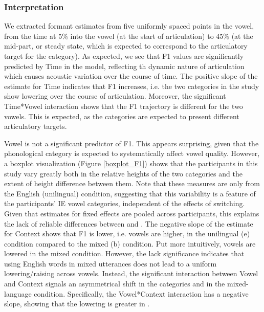 \documentclass[12 pt]{article}
\newcommand{\nt}[1]{\textipa{[#1]}} %
\begin{document}
\subsubsection*{Interpretation}
We extracted formant estimates from five uniformly spaced points in the vowel, from the time at 5\% into the vowel (at the start of articulation) to 45\% (at the mid-part, or steady state, which is expected to correspond to the articulatory target for the category). As expected, we see that F1 values are significantly predicted by Time in the model, reflecting th dynamic nature of articulation which causes acoustic variation over the course of time. The positive slope of the estimate for Time indicates that F1 increases, i.e. the two categories in the study show lowering over the course of articulation. Moreover, the significant Time*Vowel interaction shows that the F1 trajectory is different for the two vowels. This is expected, as the categories are expected to present different articulatory targets.  

 Vowel is not a significant predictor of F1. This appears surprising, given that the phonological category is expected to systematically affect vowel quality. However, a boxplot visualization (Figure \ref{boxplot_F1}) shows that the participants in this study vary greatly both in the relative heights of the two categories \nt{2, \ae} and the extent of height difference between them. Note that these measures are only from the English (unilingual) condition, suggesting that this variability is a feature of the participants' IE vowel categories, independent of the effects of switching. Given that estimates for fixed effects are pooled across participants, this explains the lack of reliable differences between \nt{2} and \nt{\ae}. The negative slope of the estimate for Context shows that F1 is lower, i.e. vowels are higher, in the unilingual (e) condition compared to the mixed (b) condition. Put more intuitively, vowels are lowered in the mixed condition. However, the lack significance indicates that using English words in mixed utterances does not lead to a uniform lowering/raising across vowels. Instead, the significant interaction between Vowel and Context signals an asymmetrical shift in the categories \nt{2} and \nt{\ae} in the mixed-language condition. Specifically, the Vowel*Context interaction has a negative slope, showing that the lowering is greater in \nt{2}.  
 
\end{document}

